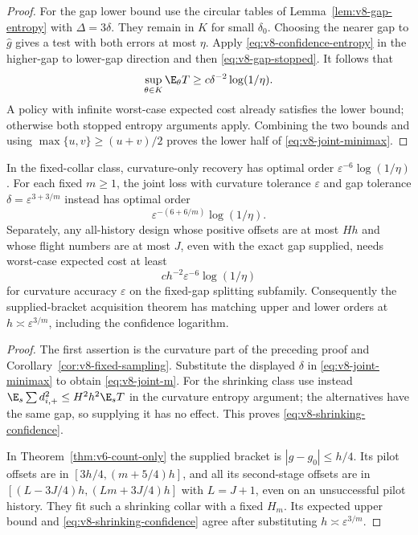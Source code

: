 \begin{proof}
For the gap lower bound use the circular tables of
Lemma~\ref{lem:v8-gap-entropy} with $\Delta=3\delta$. They remain in
$K$ for small $\delta_0$. Choosing the nearer gap to $\widehat g$
gives a test with both errors at most $\eta$. Apply
\eqref{eq:v8-confidence-entropy} in the higher-gap to lower-gap
direction and then \eqref{eq:v8-gap-stopped}. It follows that
\[
                     \sup_{\theta\in K}\E_\theta T
                      \ge c\delta^{-2}\log(1/\eta).
\]
A policy with infinite worst-case expected cost already satisfies the
lower bound; otherwise both stopped entropy arguments apply. Combining
the two bounds and using $\max\{u,v\}\ge(u+v)/2$ proves the lower
half of \eqref{eq:v8-joint-minimax}.
\end{proof}

\begin{corollary}
\label{cor:v8-comparison}
In the fixed-collar class, curvature-only recovery has optimal order
$\varepsilon^{-6}\log(1/\eta)$. For each fixed $m\ge1$, the joint
loss with curvature tolerance $\varepsilon$ and gap tolerance
$\delta=\varepsilon^{3+3/m}$ instead has optimal order
\begin{equation}\label{eq:v8-joint-m}
                    \varepsilon^{-(6+6/m)}\log(1/\eta).
\end{equation}
Separately, any all-history design whose positive offsets are at most
$Hh$ and whose flight numbers are at most $J$, even with the exact gap
supplied, needs worst-case expected cost at least
\begin{equation}\label{eq:v8-shrinking-confidence}
                    c h^{-2}\varepsilon^{-6}\log(1/\eta)
\end{equation}
for curvature accuracy $\varepsilon$ on the fixed-gap splitting
subfamily. Consequently the supplied-bracket acquisition theorem has
matching upper and lower orders at $h\asymp\varepsilon^{3/m}$,
including the confidence logarithm.
\end{corollary}
\begin{proof}
The first assertion is the curvature part of the preceding proof and
Corollary~\ref{cor:v8-fixed-sampling}. Substitute the displayed
$\delta$ in \eqref{eq:v8-joint-minimax} to obtain
\eqref{eq:v8-joint-m}. For the shrinking class use instead
$\E_s\sum d_{i,+}^2\le H^2h^2\E_sT$ in the curvature entropy
argument; the alternatives have the same gap, so supplying it has no
effect. This proves \eqref{eq:v8-shrinking-confidence}.

In Theorem~\ref{thm:v6-count-only} the supplied bracket is
$|g-g_0|\le h/4$. Its pilot offsets are in
$[3h/4,(m+5/4)h]$, and all its second-stage offsets are in
$[(L-3J/4)h,(Lm+3J/4)h]$ with $L=J+1$, even on an unsuccessful
pilot history. They fit such a shrinking collar with a fixed $H_m$.
Its expected upper bound and \eqref{eq:v8-shrinking-confidence} agree
after substituting $h\asymp\varepsilon^{3/m}$.
\end{proof}


